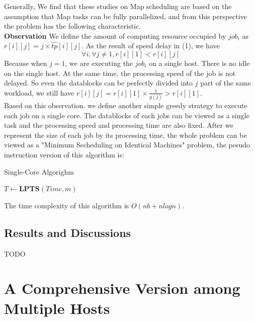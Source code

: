 \documentclass{llncs}
\begin{document}
  Generally, We find that these studies on Map scheduling are based on the assumption that Map tasks can be fully parallelized, and from this perspective the problem has the following characteristic.\\
  \textbf{Observation} We define the amount of computing resource occupied by $job_i$ as $r[i][j] = j \times \hat{tp}[i][j]$. As the result of speed delay in (1), we have
  \begin{equation}
    \forall i, \forall j \neq 1, r[i][1] < r[i][j]
  \end{equation}
  Because when $j=1$, we are executing the $job_i$ on a single host. There is no idle on the single host. At the same time, the processing speed of the job is not delayed. So even the datablocks can be perfectly divided into $j$ part of the same workload, we still have $r[i][j] = r[i][1] \times \frac{1}{g(j)} > r[i][1]$.\\
  Based on this observation. we define another simple greedy strategy to execute each job on a single core. The datablocks of each jobs can be viewed as a single task and the processing speed and processing time are also fixed. After we represent the size of each job by its processing time, the whole problem can be viewed as a "Minimum Secheduling on Identical Machines" problem, the pesudo instruction version of this algorithm is:\\
     \begin{minipage}[t]{0.9\textwidth}
     \begin{algorithm}[H]
       \BlankLine
       \caption{Single-Core Algorighm}\label{Alg_2}
       \BlankLine
       $T \leftarrow $\textbf{LPTS}$(Time,m)$
     \end{algorithm}
   \end{minipage}
    \hspace{5mm}

   The time complexity of this algorithm is $O(nb + nlogn)$.
\subsection{Results and Discussions}\label{subsec-result1}
TODO
\section{A Comprehensive Version among Multiple Hosts}
\label{sec-problem2}
\end{document}
